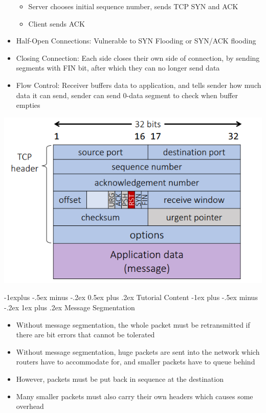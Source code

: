 \documentclass[10pt, landscape]{article}
\makeatletter
\renewcommand{\section}{\@startsection{section}{1}{0mm}%
                                {-1ex plus -.5ex minus -.2ex}%
                                {0.5ex plus .2ex}%
                                {\normalfont\large\bfseries}}
\renewcommand{\section}{\@startsection{section}{2}{0mm}%
                                {-1explus -.5ex minus -.2ex}%
                                {0.5ex plus .2ex}%
                                {\normalfont\normalsize\bfseries}}
\renewcommand{\subsection}{\@startsection{subsection}{3}{0mm}%
                                {-1ex plus -.5ex minus -.2ex}%
                                {1ex plus .2ex}%
                                {\normalfont\small\bfseries}}%
\makeatother
\begin{document}
\begin{multicols*}{3}
\begin{itemize}
\begin{itemize}
        \item Server chooses initial sequence number, sends TCP SYN and ACK
        \item Client sends ACK
    \end{itemize}
    \item Half-Open Connections: Vulnerable to SYN Flooding or SYN/ACK flooding
    \item Closing Connection: Each side closes their own side of connection, by sending segments with FIN bit, after which they can no longer send data
    \item Flow Control: Receiver buffers data to application, and tells sender how much data it can send, sender can send 0-data segment to check when buffer empties
\end{itemize}
\begin{center}
    \includegraphics[width=0.9\linewidth]{TCP.png}
\end{center}

\section{Tutorial Content}
\subsection{Message Segmentation}
\begin{itemize}
    \item Without message segmentation, the whole packet must be retransmitted if there are bit errors that cannot be tolerated
    \item Without message segmentation, huge packets are sent into the network which routers have to accommodate for, and smaller packets have to queue behind
    \item However, packets must be put back in sequence at the destination
    \item Many smaller packets must also carry their own headers which causes some overhead
\end{itemize}

\end{multicols*}
\end{document}
